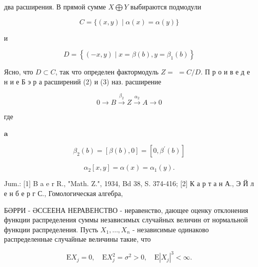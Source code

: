 \documentclass[10pt]{article}
\begin{document}
два расширения. В прямой сумме $X \bigoplus Y$ выбираются подмодули



\[

C=\{(x, y) \mid \alpha(x)=\alpha(y)\}

\]



и



\[

D=\left\{(-x, y) \mid x=\beta(b), y=\beta_{1}(b)\right\}

\]



Ясно, что $D \subset C$, так что определен фактормодуль $Z=$ $=C / D$. П р о и в е д е н и е Б э р а расширений (2) и (3) наз. расширение



\[

0 \longrightarrow B \stackrel{\beta_{2}}{\longrightarrow} Z \stackrel{\alpha_{2}}{\longrightarrow} A \longrightarrow 0

\]



где



$\mathbf{a}$



\[

\beta_{2}(b)=[\beta(b), 0]=\left[0, \beta^{\prime}(b)\right]

\]



\[

\alpha_{2}[x, y]=\alpha(x)=\alpha_{1}(y) .

\]



Jum.: [1] B a e r R., "Math. Z.", 1934, Bd 38, S. 374-416; [2] К а р т а н А., Э Й л е н б е р г С., Гомологическая алгебра,



БӘРРИ - ӘССЕЕНА НЕРАВЕНСТВО - неравенство, дающее оценку отклонения функции распределения суммы независимых случайных величин от нормальной функции распределения. Пусть $X_{1}, \ldots, X_{n}$ - независимые одинаково распределенные случайные величины такие, что



\[

\mathrm{E} X_{j}=0, \quad \mathrm{E} X_{j}^{2}=\sigma^{2}>0, \quad \mathrm{E}\left|X_{j}\right|^{3}<\infty .

\]
\end{document}
